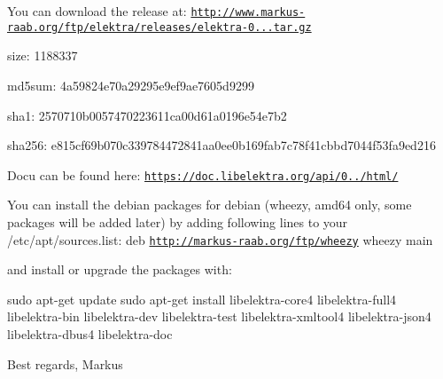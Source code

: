You can download the release at\+: \href{http://www.markus-raab.org/ftp/elektra/releases/elektra-0.8.6.tar.gz}{\tt http\+://www.\+markus-\/raab.\+org/ftp/elektra/releases/elektra-\/0...\+tar.\+gz}


\begin{DoxyItemize}
\item size\+: 1188337
\item md5sum\+: 4a59824e70a29295e9ef9ae7605d9299
\item sha1\+: 2570710b0057470223611ca00d61a0196e54e7b2
\item sha256\+: e815cf69b070c339784472841aa0ee0b169fab7c78f41cbbd7044f53fa9ed216
\end{DoxyItemize}

Docu can be found here\+: \href{https://doc.libelektra.org/api/0.8.6/html/}{\tt https\+://doc.\+libelektra.\+org/api/0../html/}

You can install the debian packages for debian (wheezy, amd64 only, some packages will be added later) by adding following lines to your /etc/apt/sources.list\+: deb \href{http://markus-raab.org/ftp/wheezy}{\tt http\+://markus-\/raab.\+org/ftp/wheezy} wheezy main

and install or upgrade the packages with\+: \begin{DoxyVerb}sudo apt-get update
sudo apt-get install libelektra-core4 libelektra-full4 libelektra-bin libelektra-dev libelektra-test libelektra-xmltool4 libelektra-json4 libelektra-dbus4 libelektra-doc
\end{DoxyVerb}


Best regards, Markus 